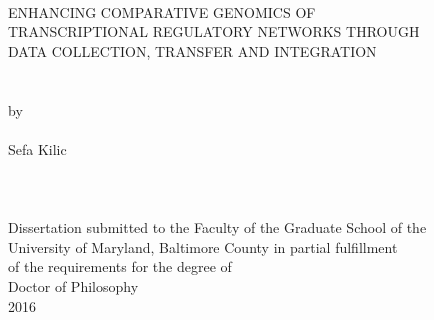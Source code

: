 
\thispagestyle{empty}
\hbox{\ }
\vspace{1in}
\renewcommand{\baselinestretch}{1}
\small\normalsize
\begin{center}

\large{{ENHANCING COMPARATIVE GENOMICS OF \\
TRANSCRIPTIONAL REGULATORY NETWORKS THROUGH\\
DATA COLLECTION, TRANSFER AND INTEGRATION}}\\
\ \\
\ \\
\large{by} \\
\ \\
\large{Sefa Kilic}%
\ \\
\ \\
\ \\
\ \\
\normalsize
Dissertation submitted to the Faculty of the Graduate School of the \\
University of Maryland, Baltimore County in partial fulfillment \\
of the requirements for the degree of \\
Doctor of Philosophy \\
2016
\end{center}

\vspace{7.5em}

